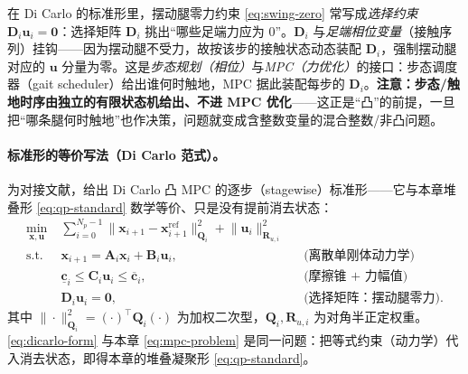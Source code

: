 \begin{insight}\label{ins:selection-matrix}
在 Di Carlo 的标准形里，摆动腿零力约束 \cref{eq:swing-zero} 常写成\emph{选择约束} $\mathbf{D}_i\boldsymbol{u}_i=\mathbf{0}$：选择矩阵 $\mathbf{D}_i$ 挑出“哪些足端力应为 $0$”。$\mathbf{D}_i$ 与\emph{足端相位变量}（接触序列）挂钩——因为摆动腿不受力，故按该步的接触状态动态装配 $\mathbf{D}_i$，强制摆动腿对应的 $\boldsymbol{u}$ 分量为零。这是\emph{步态规划（相位）}与\emph{MPC（力优化）}的接口：步态调度器（gait scheduler）给出谁何时触地，MPC 据此装配每步的 $\mathbf{D}_i$。\textbf{注意：步态/触地时序由独立的有限状态机给出、不进 MPC 优化}——这正是“凸”的前提，一旦把“哪条腿何时触地”也作决策，问题就变成含整数变量的混合整数/非凸问题。
\end{insight}

\paragraph{标准形的等价写法（Di Carlo 范式）。}
为对接文献，给出 Di Carlo 凸 MPC 的逐步（stagewise）标准形——它与本章堆叠形 \cref{eq:qp-standard} 数学等价、只是没有提前消去状态\cite{dicarlo2018cheetah}：
\begin{equation}
\begin{aligned}
  \min_{\boldsymbol{x},\boldsymbol{u}}\;& \sum_{i=0}^{N_p-1}\big\|\boldsymbol{x}_{i+1}-\boldsymbol{x}_{i+1}^{\mathrm{ref}}\big\|_{\mathbf{Q}_i}^2+\big\|\boldsymbol{u}_i\big\|_{\mathbf{R}_{u,i}}^2\\
  \text{s.t.}\;& \boldsymbol{x}_{i+1}=\mathbf{A}_i\boldsymbol{x}_i+\mathbf{B}_i\boldsymbol{u}_i,\quad &&\text{(离散单刚体动力学)}\\
  & \underline{\mathbf{c}}_i\le\mathbf{C}_i\boldsymbol{u}_i\le\overline{\mathbf{c}}_i,\quad &&\text{(摩擦锥 + 力幅值)}\\
  & \mathbf{D}_i\boldsymbol{u}_i=\mathbf{0},\quad &&\text{(选择矩阵：摆动腿零力)}.
\end{aligned}
\label{eq:dicarlo-form}
\end{equation}
其中 $\|\cdot\|_{\mathbf{Q}_i}^2=(\cdot)^\top\mathbf{Q}_i(\cdot)$ 为加权二次型，$\mathbf{Q}_i,\mathbf{R}_{u,i}$ 为对角半正定权重。\cref{eq:dicarlo-form} 与本章 \cref{eq:mpc-problem} 是同一问题：把等式约束（动力学）代入消去状态，即得本章的堆叠凝聚形 \cref{eq:qp-standard}\cite{dicarlo2018cheetah}。

